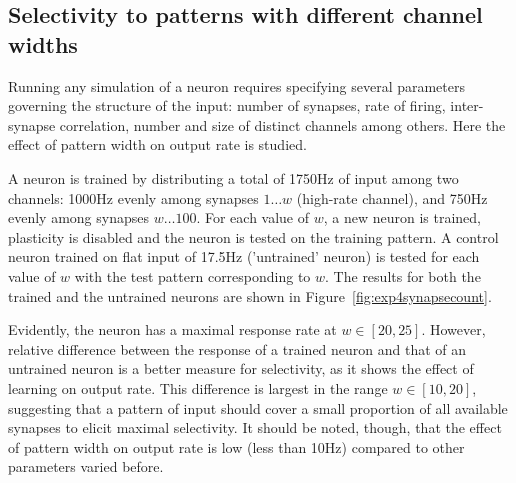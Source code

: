 \documentclass[a4paper,12pt]{report}
\theoremstyle{definition}
\begin{document}
\subsection{Selectivity to patterns with different channel widths}
\label{subsec:patternwidths}


Running any simulation of a neuron requires specifying several parameters governing the structure of the input: number of synapses, rate of firing, inter-synapse correlation, number and size of distinct channels among others. Here the effect of pattern width on output rate is studied.

A neuron is trained by distributing a total of 1750Hz of input among two channels: 1000Hz evenly among synapses $1 \ldots w$ (high-rate channel), and 750Hz evenly among synapses $w \ldots 100$. For each value of $w$, a new neuron is trained, plasticity is disabled and the neuron is tested on the training pattern. A control neuron trained on flat input of 17.5Hz ('untrained' neuron) is tested for each value of $w$ with the test pattern corresponding to $w$. The results for both the trained and the untrained neurons are shown in Figure~\ref{fig:exp4synapsecount}.

Evidently, the neuron has a maximal response rate at $w\in[20,25]$. However, relative difference between the response of a trained neuron and that of an untrained neuron is a better measure for selectivity, as it shows the effect of learning on output rate. This difference is largest in the range $w \in [10,20]$, suggesting that a pattern of input should cover a small proportion of all available synapses to elicit maximal selectivity. It should be noted, though, that the effect of pattern width on output rate is low (less than 10Hz) compared to other parameters varied before.
\end{document}
